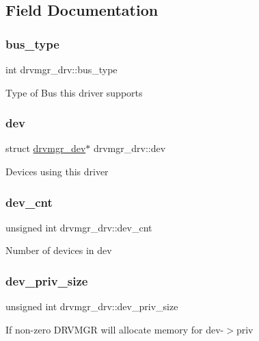 \subsection{Field Documentation}
\mbox{\label{structdrvmgr__drv_ae555ca5e714134cbf25cfb7a6346ed8c}} 
\subsubsection{\texorpdfstring{bus\_type}{bus\_type}}
{\footnotesize\ttfamily int drvmgr\+\_\+drv\+::bus\+\_\+type}

Type of Bus this driver supports \mbox{\label{structdrvmgr__drv_ac3340a7ceff44d4bd013823fc45338dc}} 
\subsubsection{\texorpdfstring{dev}{dev}}
{\footnotesize\ttfamily struct \mbox{\hyperlink{structdrvmgr__dev}{drvmgr\+\_\+dev}}$\ast$ drvmgr\+\_\+drv\+::dev}

Devices using this driver \mbox{\label{structdrvmgr__drv_a5ea883c06b15c9191d0e7a030ee2b4ce}} 
\subsubsection{\texorpdfstring{dev\_cnt}{dev\_cnt}}
{\footnotesize\ttfamily unsigned int drvmgr\+\_\+drv\+::dev\+\_\+cnt}

Number of devices in dev \mbox{\label{structdrvmgr__drv_a9a94cfbbae8181703102dc9efb241db9}} 
\subsubsection{\texorpdfstring{dev\_priv\_size}{dev\_priv\_size}}
{\footnotesize\ttfamily unsigned int drvmgr\+\_\+drv\+::dev\+\_\+priv\+\_\+size}

If non-\/zero D\+R\+V\+M\+GR will allocate memory for dev-\/$>$priv \mbox{\label{structdrvmgr__drv_ad7bea4ea7a3a8587b64b82e9b7c9171f}} 
